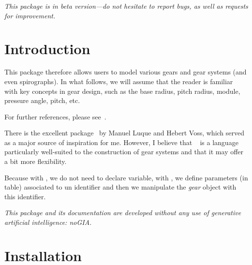 \documentclass[english]{ltxdoc}
\begin{document}
\begin{tcolorbox}[ arc=0pt,outer arc=0pt,
  colback=darkred!3,
  colframe=darkred,
  breakable,
  boxsep=0pt,left=5pt,right=5pt,top=5pt,bottom=5pt, bottomtitle =
  3pt, toptitle=3pt,
  boxrule=0pt,bottomrule=0.5pt,toprule=0.5pt, toprule at break =
  0pt, bottomrule at break = 0pt,]
  \itshape
  This package is in beta version---do not hesitate to report bugs, as well as requests for improvement.
\end{tcolorbox}

\section{Introduction}

This package therefore allows users to model various gears and gear systems (and
even spirographs). In what follows, we will assume that the reader is familiar
with key concepts in gear design, such as the base radius, pitch radius, module,
pressure angle, pitch, etc. 

For further references, please
see~\cite{cuisinier,chevasson,chevalier,wikipedia_gear,zpag}. 

There is the excellent  package~\cite{pst-gears} by Manuel
Luque and Hebert Voss, which served as a major source of inspiration for me.
However, I believe that ~\cite{metapost} is a language
particularly well-suited to the construction of gear systems and that it may
offer a bit more flexibility. 

Because with , we do not need to declare 
variable, with \mpgears, we define parameters (in table) associated to un
 identifier and then we manipulate the \emph{gear} object with
this  identifier. 

\begin{tcolorbox}[ arc=0pt,outer arc=0pt,
  colback=darkred!3,
  colframe=darkred,
  breakable,
  boxsep=0pt,left=5pt,right=5pt,top=5pt,bottom=5pt, bottomtitle =
  3pt, toptitle=3pt,
  boxrule=0pt,bottomrule=0.5pt,toprule=0.5pt, toprule at break =
  0pt, bottomrule at break = 0pt,]
  \itshape
  This package and its documentation are developed without any use of generative
  artificial intelligence: noGIA. 
\end{tcolorbox}


\section{Installation}
\end{document}
